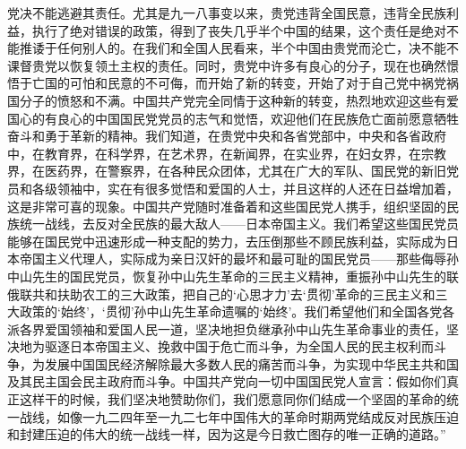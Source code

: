 \begin{maonote}
党决不能逃避其责任。尤其是九一八事变以来，贵党违背全国民意，违背全民族利益，执行了绝对错误的政策，得到了丧失几乎半个中国的结果，这个责任是绝对不能推诿于任何别人的。在我们和全国人民看来，半个中国由贵党而沦亡，决不能不课督贵党以恢复领土主权的责任。同时，贵党中许多有良心的分子，现在也确然憬悟于亡国的可怕和民意的不可侮，而开始了新的转变，开始了对于自己党中祸党祸国分子的愤怒和不满。中国共产党完全同情于这种新的转变，热烈地欢迎这些有爱国心的有良心的中国国民党党员的志气和觉悟，欢迎他们在民族危亡面前愿意牺牲奋斗和勇于革新的精神。我们知道，在贵党中央和各省党部中，中央和各省政府中，在教育界，在科学界，在艺术界，在新闻界，在实业界，在妇女界，在宗教界，在医药界，在警察界，在各种民众团体，尤其在广大的军队、国民党的新旧党员和各级领袖中，实在有很多觉悟和爱国的人士，并且这样的人还在日益增加着，这是非常可喜的现象。中国共产党随时准备着和这些国民党人携手，组织坚固的民族统一战线，去反对全民族的最大敌人——日本帝国主义。我们希望这些国民党员能够在国民党中迅速形成一种支配的势力，去压倒那些不顾民族利益，实际成为日本帝国主义代理人，实际成为亲日汉奸的最坏和最可耻的国民党员——那些侮辱孙中山先生的国民党员，恢复孙中山先生革命的三民主义精神，重振孙中山先生的联俄联共和扶助农工的三大政策，把自己的‘心思才力’去‘贯彻’革命的三民主义和三大政策的‘始终’，‘贯彻’孙中山先生革命遗嘱的‘始终’。我们希望他们和全国各党各派各界爱国领袖和爱国人民一道，坚决地担负继承孙中山先生革命事业的责任，坚决地为驱逐日本帝国主义、挽救中国于危亡而斗争，为全国人民的民主权利而斗争，为发展中国国民经济解除最大多数人民的痛苦而斗争，为实现中华民主共和国及其民主国会民主政府而斗争。中国共产党向一切中国国民党人宣言：假如你们真正这样干的时候，我们坚决地赞助你们，我们愿意同你们结成一个坚固的革命的统一战线，如像一九二四年至一九二七年中国伟大的革命时期两党结成反对民族压迫和封建压迫的伟大的统一战线一样，因为这是今日救亡图存的唯一正确的道路。”
\end{maonote}
